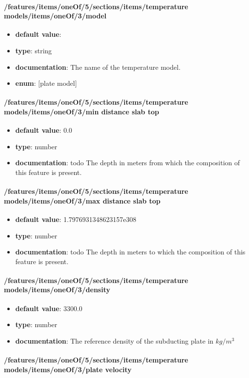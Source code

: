 \paragraph{/features/items/oneOf/5/sections/items/temperature models/items/oneOf/3/model}
\begin{itemize}\item {\bf default value}: 
\item {\bf type}: string
\item {\bf documentation}: The name of the temperature model.
\item {\bf enum}: [plate model]\end{itemize}\paragraph{/features/items/oneOf/5/sections/items/temperature models/items/oneOf/3/min distance slab top}
\begin{itemize}\item {\bf default value}: 0.0
\item {\bf type}: number
\item {\bf documentation}: todo The depth in meters from which the composition of this feature is present.
\end{itemize}\paragraph{/features/items/oneOf/5/sections/items/temperature models/items/oneOf/3/max distance slab top}
\begin{itemize}\item {\bf default value}: 1.7976931348623157e308
\item {\bf type}: number
\item {\bf documentation}: todo The depth in meters to which the composition of this feature is present.
\end{itemize}\paragraph{/features/items/oneOf/5/sections/items/temperature models/items/oneOf/3/density}
\begin{itemize}\item {\bf default value}: 3300.0
\item {\bf type}: number
\item {\bf documentation}: The reference density of the subducting plate in $kg/m^3$
\end{itemize}\paragraph{/features/items/oneOf/5/sections/items/temperature models/items/oneOf/3/plate velocity}
